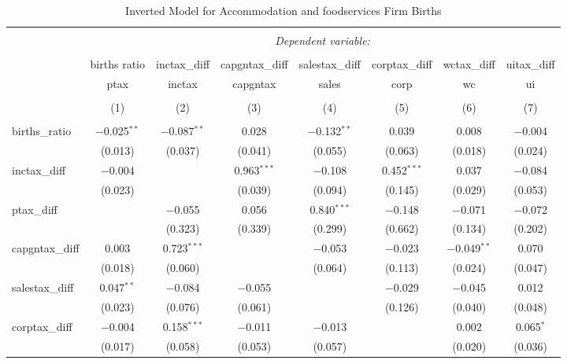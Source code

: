 
\begin{table}[!htbp] \centering 
  \caption{Inverted Model for  Accommodation and foodservices Firm Births} 
  \label{72rd} 
\footnotesize 
\begin{tabular}{@{\extracolsep{5pt}}lccccccc} 
\\[-1.8ex]\hline 
\hline \\[-1.8ex] 
 & \multicolumn{7}{c}{\textit{Dependent variable:}} \\ 
\cline{2-8} 
\\[-1.8ex] & births ratio & inctax\_diff & capgntax\_diff & salestax\_diff & corptax\_diff & wctax\_diff & uitax\_diff \\ 
 & ptax & inctax & capgntax & sales & corp & wc & ui \\ 
\\[-1.8ex] & (1) & (2) & (3) & (4) & (5) & (6) & (7)\\ 
\hline \\[-1.8ex] 
 births\_ratio & $-$0.025$^{**}$ & $-$0.087$^{**}$ & 0.028 & $-$0.132$^{**}$ & 0.039 & 0.008 & $-$0.004 \\ 
  & (0.013) & (0.037) & (0.041) & (0.055) & (0.063) & (0.018) & (0.024) \\ 
  inctax\_diff & $-$0.004 &  & 0.963$^{***}$ & $-$0.108 & 0.452$^{***}$ & 0.037 & $-$0.084 \\ 
  & (0.023) &  & (0.039) & (0.094) & (0.145) & (0.029) & (0.053) \\ 
  ptax\_diff &  & $-$0.055 & 0.056 & 0.840$^{***}$ & $-$0.148 & $-$0.071 & $-$0.072 \\ 
  &  & (0.323) & (0.339) & (0.299) & (0.662) & (0.134) & (0.202) \\ 
  capgntax\_diff & 0.003 & 0.723$^{***}$ &  & $-$0.053 & $-$0.023 & $-$0.049$^{**}$ & 0.070 \\ 
  & (0.018) & (0.060) &  & (0.064) & (0.113) & (0.024) & (0.047) \\ 
  salestax\_diff & 0.047$^{**}$ & $-$0.084 & $-$0.055 &  & $-$0.029 & $-$0.045 & 0.012 \\ 
  & (0.023) & (0.076) & (0.061) &  & (0.126) & (0.040) & (0.048) \\ 
  corptax\_diff & $-$0.004 & 0.158$^{***}$ & $-$0.011 & $-$0.013 &  & 0.002 & 0.065$^{*}$ \\ 
  & (0.017) & (0.058) & (0.053) & (0.057) &  & (0.020) & (0.036) \\ 

\end{tabular}
\end{table}
